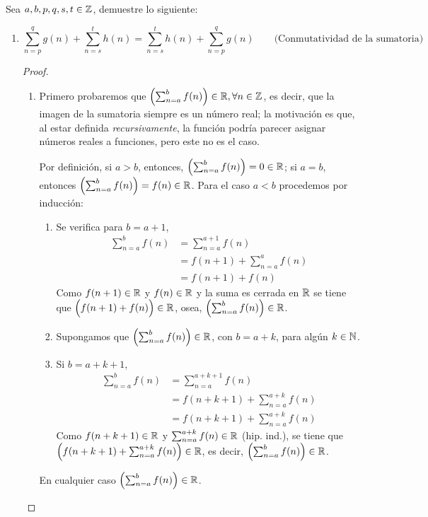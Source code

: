 Sea $a,b,p,q,s,t\in \mathbb{Z}$, demuestre lo siguiente:

\begin{enumerate}[label=\alph*)]
  \item \[\sum_{n=p}^{q} g(n) + \sum_{n=s}^{t} h(n) = \sum_{n=s}^{t} h(n) + \sum_{n=p}^{q} g(n)\qquad \text{(Conmutatividad de la sumatoria)}\]
  \begin{proof}\leavevmode
    \begin{enumerate}[label=\Roman*.]
      \item Primero probaremos que $\Bigl(\sum_{n=a}^{b} f(n)\Bigr)\in \mathbb{R},\forall n\in \mathbb{Z}$, es decir, que la imagen de la sumatoria siempre es un número real; la motivación es que, al estar definida \textit{recursivamente}, la función podría parecer asignar números reales a funciones, pero este no es el caso.
      
      Por definición, si $a>b$, entonces, $\Bigl(\sum_{n=a}^{b} f(n)\Bigr)=0\in \mathbb{R}$; si $a=b$, entonces $\Bigl(\sum_{n=a}^{b} f(n)\Bigr)=f(n)\in \mathbb{R}$. Para el caso $a<b$ procedemos por inducción:
      \begin{enumerate}[label=\roman*)]
        \item Se verifica para $b=a+1$,
        \begin{align*}
          \sum_{n=a}^{b} f(n) &= \sum_{n=a}^{a+1} f(n)\\
          &= f(n+1) + \sum_{n=a}^{a} f(n)\\
          &= f(n+1) + f(n)
        \end{align*}
        Como $f(n+1)\in \mathbb{R}$ y $f(n)\in \mathbb{R}$ y la suma es cerrada en $\mathbb{R}$ se tiene que $\Bigl(f(n+1) + f(n)\Bigr)\in \mathbb{R}$, osea, $\Bigl(\sum_{n=a}^{b} f(n)\Bigr)\in \mathbb{R}$.
        \item Supongamos que $\Bigl(\sum_{n=a}^{b} f(n)\Bigr)\in \mathbb{R}$, con $b=a+k$, para algún $k\in \mathbb{N}$.
      \item Si $b=a+k+1$,
      \begin{align*}
        \sum_{n=a}^{b} f(n) &= \sum_{n=a}^{a+k+1} f(n)\\
        &= f(n+k+1) + \sum_{n=a}^{a+k} f(n)\\
        &= f(n+k+1) + \sum_{n=a}^{a+k} f(n)
      \end{align*}
      Como $f(n+k+1)\in \mathbb{R}$ y $\sum_{n=a}^{a+k} f(n)\in \mathbb{R}$ (hip. ind.), se tiene que $\Bigl(f(n+k+1) + \sum_{n=a}^{a+k} f(n)\Bigr)\in \mathbb{R}$, es decir, $\Bigl(\sum_{n=a}^{b} f(n)\Bigr)\in \mathbb{R}$.
      \end{enumerate}
      En cualquier caso $\Bigl(\sum_{n=a}^{b} f(n)\Bigr)\in \mathbb{R}$.
    


\end{enumerate}
\end{proof}
\end{enumerate}
